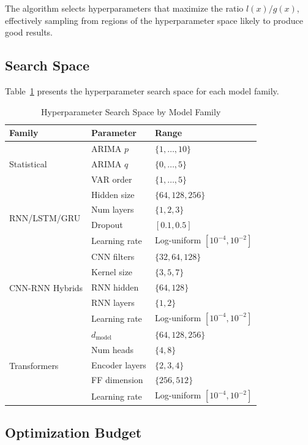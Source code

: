 The algorithm selects hyperparameters that maximize the ratio $l(x)/g(x)$, effectively sampling from regions of the hyperparameter space likely to produce good results.

\subsection{Search Space}

Table~\ref{tab:search_space} presents the hyperparameter search space for each model family.

\begin{table}[H]
\centering
\caption{Hyperparameter Search Space by Model Family}
\label{tab:search_space}
\begin{tabular}{p{3cm}p{2.8cm}p{6.5cm}}
\toprule
\textbf{Family} & \textbf{Parameter} & \textbf{Range} \\
\midrule
\multirow{3}{*}{Statistical} & ARIMA $p$ & $\{1, \ldots, 10\}$ \\
 & ARIMA $q$ & $\{0, \ldots, 5\}$ \\
 & VAR order & $\{1, \ldots, 5\}$ \\
\midrule
\multirow{4}{*}{RNN/LSTM/GRU} & Hidden size & $\{64, 128, 256\}$ \\
 & Num layers & $\{1, 2, 3\}$ \\
 & Dropout & $[0.1, 0.5]$ \\
 & Learning rate & Log-uniform $[10^{-4}, 10^{-2}]$ \\
\midrule
\multirow{5}{*}{CNN-RNN Hybrids} & CNN filters & $\{32, 64, 128\}$ \\
 & Kernel size & $\{3, 5, 7\}$ \\
 & RNN hidden & $\{64, 128\}$ \\
 & RNN layers & $\{1, 2\}$ \\
 & Learning rate & Log-uniform $[10^{-4}, 10^{-2}]$ \\
\midrule
\multirow{5}{*}{Transformers} & $d_{\text{model}}$ & $\{64, 128, 256\}$ \\
 & Num heads & $\{4, 8\}$ \\
 & Encoder layers & $\{2, 3, 4\}$ \\
 & FF dimension & $\{256, 512\}$ \\
 & Learning rate & Log-uniform $[10^{-4}, 10^{-2}]$ \\
\bottomrule
\end{tabular}
\end{table}

\subsection{Optimization Budget}

